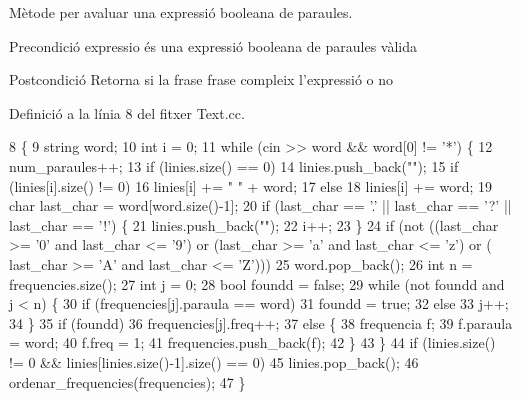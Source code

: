 Mètode per avaluar una expressió booleana de paraules. 

\begin{DoxyPrecond}{Precondició}
expressio és una expressió booleana de paraules vàlida 
\end{DoxyPrecond}
\begin{DoxyPostcond}{Postcondició}
Retorna si la frase frase compleix l'expressió o no 
\end{DoxyPostcond}


Definició a la línia 8 del fitxer Text.\+cc.


\begin{DoxyCode}
8                              \{
9     \textcolor{keywordtype}{string} word;
10     \textcolor{keywordtype}{int} i = 0;
11     \textcolor{keywordflow}{while} (cin >> word && word[0] != \textcolor{charliteral}{'*'}) \{
12         num\_paraules++;
13         \textcolor{keywordflow}{if} (linies.size() == 0)
14             linies.push\_back(\textcolor{stringliteral}{""});
15         \textcolor{keywordflow}{if} (linies[i].size() != 0)
16             linies[i] += \textcolor{stringliteral}{" "} + word;
17         \textcolor{keywordflow}{else}
18             linies[i] += word;
19         \textcolor{keywordtype}{char} last\_char = word[word.size()-1];
20         \textcolor{keywordflow}{if} (last\_char == \textcolor{charliteral}{'.'} || last\_char == \textcolor{charliteral}{'?'} || last\_char == \textcolor{charliteral}{'!'}) \{
21             linies.push\_back(\textcolor{stringliteral}{""});
22             i++;
23         \}
24         \textcolor{keywordflow}{if} (not ((last\_char >= \textcolor{charliteral}{'0'} and last\_char <= \textcolor{charliteral}{'9'}) or (last\_char >= \textcolor{charliteral}{'a'} and last\_char <= \textcolor{charliteral}{'z'}) or (
      last\_char >= \textcolor{charliteral}{'A'} and last\_char <= \textcolor{charliteral}{'Z'})))
25             word.pop\_back();
26         \textcolor{keywordtype}{int} n = frequencies.size();
27         \textcolor{keywordtype}{int} j = 0;
28         \textcolor{keywordtype}{bool} foundd = \textcolor{keyword}{false};
29         \textcolor{keywordflow}{while} (not foundd and j < n) \{
30             \textcolor{keywordflow}{if} (frequencies[j].paraula == word)
31                 foundd = \textcolor{keyword}{true};
32             \textcolor{keywordflow}{else}
33                 j++;
34         \}
35         \textcolor{keywordflow}{if} (foundd)
36             frequencies[j].freq++;
37         \textcolor{keywordflow}{else} \{
38             frequencia f;
39             f.paraula = word;
40             f.freq = 1;
41             frequencies.push\_back(f);
42         \}
43     \}
44     \textcolor{keywordflow}{if} (linies.size() != 0 && linies[linies.size()-1].size() == 0)
45         linies.pop\_back();
46     ordenar\_frequencies(frequencies);
47 \}
\end{DoxyCode}
